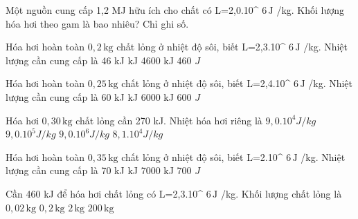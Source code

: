 \begin{ex}
Một nguồn cung cấp 1,2 MJ hữu ích cho chất có L=2,0.10^ $6\,\text{J}$ /kg. Khối lượng hóa hơi theo gam là bao nhiêu? Chỉ ghi số.
\end{ex}

\begin{ex}
Hóa hơi hoàn toàn $0,2\,\text{kg}$ chất lỏng ở nhiệt độ sôi, biết L=2,3.10^ $6\,\text{J}$ /kg. Nhiệt lượng cần cung cấp là
\choice
{46 kJ}
{ kJ}
{4600 kJ}
{460 $J$}
\end{ex}

\begin{ex}
Hóa hơi hoàn toàn $0,25\,\text{kg}$ chất lỏng ở nhiệt độ sôi, biết L=2,4.10^ $6\,\text{J}$ /kg. Nhiệt lượng cần cung cấp là
\choice
{60 kJ}
{ kJ}
{6000 kJ}
{600 $J$}
\end{ex}

\begin{ex}
Hóa hơi $0,30\,\text{kg}$ chất lỏng cần 270 kJ. Nhiệt hóa hơi riêng là
\choice
{$9,0.10^4 J/kg$}
{\True $9,0.10^5 J/kg$}
{$9,0.10^6 J/kg$}
{$8,1.10^4 J/kg$}
\end{ex}

\begin{ex}
Hóa hơi hoàn toàn $0,35\,\text{kg}$ chất lỏng ở nhiệt độ sôi, biết L=2.10^ $6\,\text{J}$ /kg. Nhiệt lượng cần cung cấp là
\choice
{70 kJ}
{ kJ}
{7000 kJ}
{700 $J$}
\end{ex}

\begin{ex}
Cần 460 kJ để hóa hơi chất lỏng có L=2,3.10^ $6\,\text{J}$ /kg. Khối lượng chất lỏng là
\choice
{$0,02\,\text{kg}$}
{\True $0,2\,\text{kg}$}
{$2\,\text{kg}$}
{$200\,\text{kg}$}
\end{ex}

